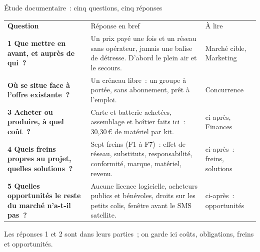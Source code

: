 \begin{frame}{Étude documentaire~: cinq questions, cinq réponses}
  \renewcommand{\arraystretch}{1.2}
  \footnotesize{} 
  \noindent\begin{tabularx}{\textwidth}{@{}>{\raggedright\arraybackslash\bfseries}p{4.2cm}>{\raggedright\arraybackslash}X>{\raggedright\arraybackslash}p{2.7cm}@{}}
    \rowcolor{insarose}
    \textcolor{insarouge}{Question} & \textcolor{insarouge}{Réponse en bref} & \textcolor{insarouge}{À lire} \\
    1 Que mettre en avant, et auprès de qui~? &
      Un prix payé une fois et un réseau sans opérateur, jamais une balise de détresse. D'abord le plein air et le secours. &
      Marché cible, Marketing \\
    \arrayrulecolor{insagris!30}\hline
    2 Où se situe \nomproduit{} face à l'offre existante~? &
      Un créneau libre~: un groupe à portée, sans abonnement, prêt à l'emploi. &
      Concurrence \\
    \hline
    3 Acheter ou produire, à quel coût~? &
      Carte et batterie achetées, assemblage et boîtier faits ici~: 30,30\,€ de matériel par kit. &
      ci-après, Finances \\
    \hline
    4 Quels freins propres au projet, quelles solutions~? &
      Sept freins (F1 à F7)~: effet de réseau, substituts, responsabilité, conformité, marque, matériel, revenu. &
      ci-après~: freins, solutions \\
    \hline
    5 Quelles opportunités le reste du marché n'a-t-il pas~? &
      Aucune licence logicielle, acheteurs publics et bénévoles, droits sur les petits colis, fenêtre avant le SMS satellite. &
      ci-après~: opportunités \\
  \end{tabularx}
  \vspace{0.05cm}
  \begin{pcompact}\centering\footnotesize
    Les réponses 1 et 2 sont dans leurs parties~; on garde ici coûts, obligations, freins et opportunités.
  \end{pcompact}
\end{frame}

